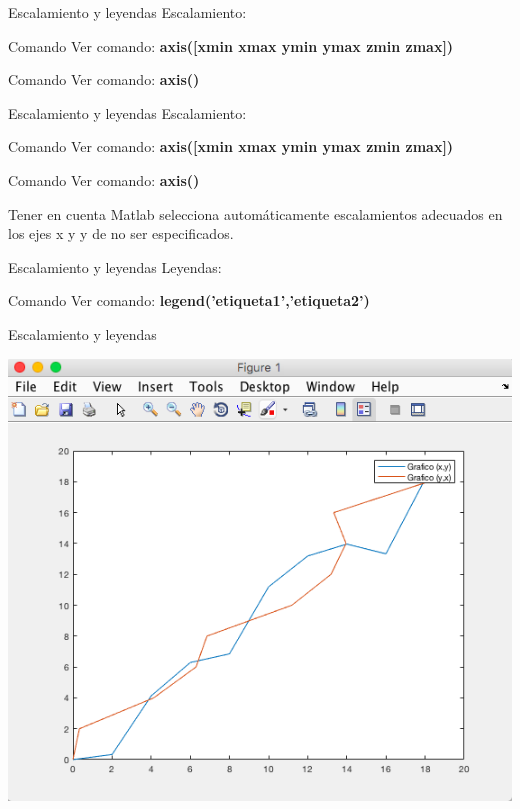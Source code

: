 \documentclass{bredelebeamer}
\begin{document}
\begin{frame}{Escalamiento y leyendas}
Escalamiento:\\
\begin{exampleblock}{Comando}
Ver comando: \textbf{axis([xmin xmax ymin ymax zmin zmax])}
\end{exampleblock}
\begin{exampleblock}{Comando}
Ver comando: \textbf{axis()}
\end{exampleblock}
\end{frame}

\begin{frame}{Escalamiento y leyendas}
Escalamiento:\\
\begin{exampleblock}{Comando}
Ver comando: \textbf{axis([xmin xmax ymin ymax zmin zmax])}
\end{exampleblock}
\begin{exampleblock}{Comando}
Ver comando: \textbf{axis()}
\end{exampleblock}
\begin{alertblock}{Tener en cuenta}
Matlab selecciona automáticamente escalamientos adecuados en los ejes x y y de no ser especificados.
\end{alertblock}
\end{frame}

\begin{frame}{Escalamiento y leyendas}
Leyendas:\\
\begin{exampleblock}{Comando}
Ver comando: \textbf{legend('etiqueta1','etiqueta2')}
\end{exampleblock}
\end{frame}

\begin{frame}{Escalamiento y leyendas}
\begin{center}
\includegraphics[scale=0.35]{images/pantalla18.png}
\end{center}
\end{frame}
\end{document}
